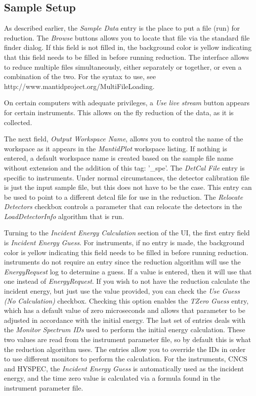 \subsection{Sample Setup}
As described earlier, the \textit{Sample Data} entry is the place to put a file (run) for reduction. The \textit{Browse} buttons allows you to locate that file via the standard file finder dialog. If this field is not filled in, the background color is yellow indicating that this field needs to be filled in before running reduction. The interface allows to reduce multiple files simultaneously, either separately or together, or even a combination of the two. For the syntax to use, see http://www.mantidproject.org/MultiFileLoading.

On certain computers with adequate privileges, a \textit{Use live stream} button appears for certain instruments. This allows on the fly reduction of the data, as it is collected.

The next field, \textit{Output Workspace Name}, allows you to control the name of the workspace as it appears in the \textit{MantidPlot} workspace listing. If nothing is entered, a default workspace name is created based on the sample file name without extension and the addition of this tag: '\_spe'. The \textit{DetCal File} entry is specific to \isis{} instruments. Under normal circumstances, the detector calibration file is just the input sample file, but this does not have to be the case. This entry can be used to point to a different detcal file for use in the reduction. The \textit{Relocate Detectors} checkbox controls a parameter that can relocate the detectors in the \textit{LoadDetectorInfo} \mantid{} algorithm that is run. 

Turning to the \textit{Incident Energy Calculation} section of the UI, the first entry field is \textit{Incident Energy Guess}. For \isis{} instruments, if no entry is made, the background color is yellow indicating this field needs to be filled in before running reduction. \sns{} instruments do not require an entry since the reduction algorithm will use the \textit{EnergyRequest} log to determine a guess. If a value is entered, then it will use that one instead of \textit{EnergyRequest}. If you wish to not have the reduction calculate the incident energy, but just use the value provided, you can check the \textit{Use Guess (No Calculation)} checkbox. Checking this option enables the \textit{TZero Guess} entry, which has a default value of zero microseconds and allows that parameter to be adjusted in accordance with the initial energy. The last set of entries deals with the \textit{Monitor Spectrum IDs} used to perform the initial energy calculation. These two values are read from the instrument parameter file, so by default this is what the reduction algorithm uses. The entries allow you to override the IDs in order to use different monitors to perform the calculation. For the \sns{} instruments, CNCS and HYSPEC, the \textit{Incident Energy Guess} is automatically used as the incident energy, and the time zero value is calculated via a formula found in the instrument parameter file.

